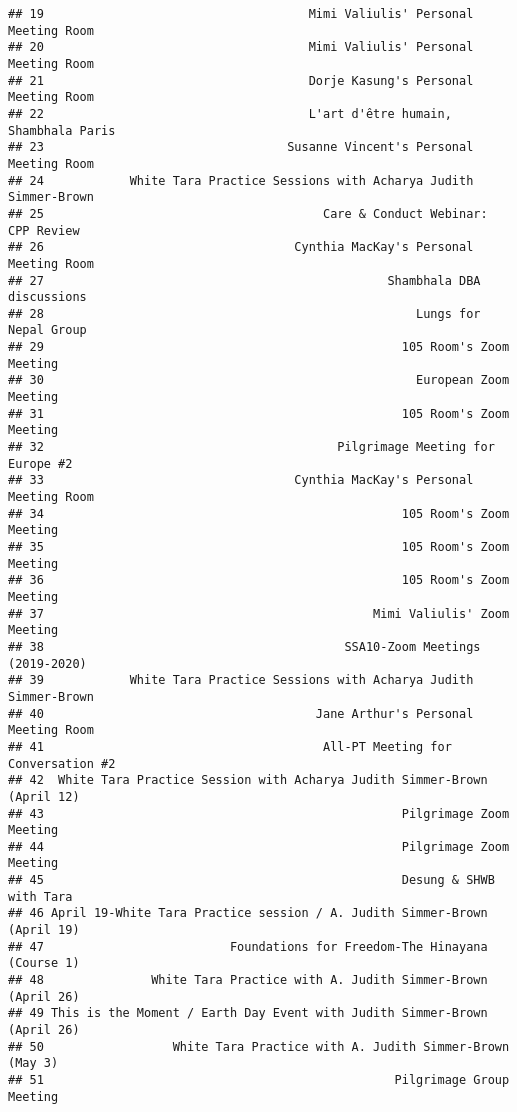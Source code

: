 \documentclass[
]{article}
\begin{document}
\begin{verbatim}
## 19                                     Mimi Valiulis' Personal Meeting Room
## 20                                     Mimi Valiulis' Personal Meeting Room
## 21                                     Dorje Kasung's Personal Meeting Room
## 22                                     L'art d'être humain, Shambhala Paris
## 23                                  Susanne Vincent's Personal Meeting Room
## 24            White Tara Practice Sessions with Acharya Judith Simmer-Brown
## 25                                       Care & Conduct Webinar: CPP Review
## 26                                   Cynthia MacKay's Personal Meeting Room
## 27                                                Shambhala DBA discussions
## 28                                                    Lungs for Nepal Group
## 29                                                  105 Room's Zoom Meeting
## 30                                                    European Zoom Meeting
## 31                                                  105 Room's Zoom Meeting
## 32                                         Pilgrimage Meeting for Europe #2
## 33                                   Cynthia MacKay's Personal Meeting Room
## 34                                                  105 Room's Zoom Meeting
## 35                                                  105 Room's Zoom Meeting
## 36                                                  105 Room's Zoom Meeting
## 37                                              Mimi Valiulis' Zoom Meeting
## 38                                          SSA10-Zoom Meetings (2019-2020)
## 39            White Tara Practice Sessions with Acharya Judith Simmer-Brown
## 40                                      Jane Arthur's Personal Meeting Room
## 41                                       All-PT Meeting for Conversation #2
## 42  White Tara Practice Session with Acharya Judith Simmer-Brown (April 12)
## 43                                                  Pilgrimage Zoom Meeting
## 44                                                  Pilgrimage Zoom Meeting
## 45                                                  Desung & SHWB with Tara
## 46 April 19-White Tara Practice session / A. Judith Simmer-Brown (April 19)
## 47                          Foundations for Freedom-The Hinayana (Course 1)
## 48               White Tara Practice with A. Judith Simmer-Brown (April 26)
## 49 This is the Moment / Earth Day Event with Judith Simmer-Brown (April 26)
## 50                  White Tara Practice with A. Judith Simmer-Brown (May 3)
## 51                                                 Pilgrimage Group Meeting

\end{verbatim}
\end{document}
